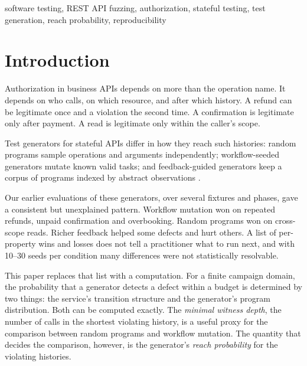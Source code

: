 \documentclass[conference]{IEEEtran}
\begin{document}
\begin{IEEEkeywords}
software testing, REST API fuzzing, authorization, stateful testing, test generation,
reach probability, reproducibility
\end{IEEEkeywords}

\section{Introduction}
Authorization in business APIs depends on more than the operation name. It depends on
who calls, on which resource, and after which history. A refund can be legitimate once
and a violation the second time. A confirmation is legitimate only after payment. A read
is legitimate only within the caller's scope.

Test generators for stateful APIs differ in how they reach such histories: random
programs sample operations and arguments independently; workflow-seeded generators mutate
known valid tasks; and feedback-guided generators keep a corpus of programs indexed by
abstract observations \cite{r9,r10,r11,r12,r13,r19}.

Our earlier evaluations of these generators, over several fixtures and phases, gave a
consistent but unexplained pattern. Workflow mutation won on repeated refunds, unpaid
confirmation and overbooking. Random programs won on cross-scope reads. Richer feedback
helped some defects and hurt others. A list of per-property wins and losses does not tell
a practitioner what to run next, and with 10--30 seeds per condition many differences
were not statistically resolvable.

This paper replaces that list with a computation. For a finite campaign domain, the
probability that a generator detects a defect within a budget is determined by two
things: the service's transition structure and the generator's program distribution. Both
can be computed exactly. The \emph{minimal witness depth}, the number of calls in the
shortest violating history, is a useful proxy for the comparison between random programs
and workflow mutation. The quantity that decides the comparison, however, is the
generator's \emph{reach probability} for the violating histories.
\end{document}
